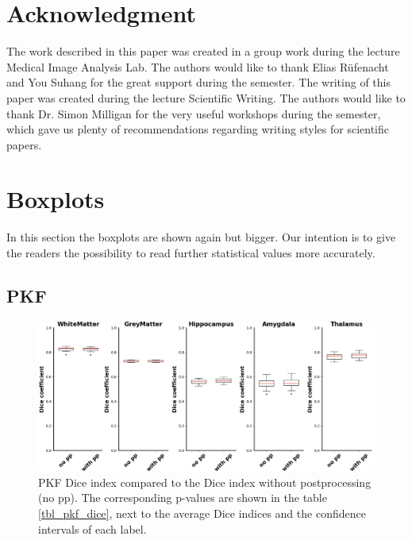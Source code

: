\documentclass[journal]{IEEEtran}
\begin{document}
\section*{Acknowledgment}

The work described in this paper was created in a group work during the lecture Medical Image Analysis Lab. The authors would like to thank Elias R\"ufenacht and You Suhang for the great support during the semester. The writing of this paper was created during the lecture Scientific Writing. The authors would like to thank Dr. Simon Milligan for the very useful workshops during the semester, which gave us plenty of recommendations regarding writing styles for scientific papers.



\newpage
\onecolumn
\section{Boxplots}
\label{sec_bb}
In this section the boxplots are shown again but bigger. Our intention is to give the readers the possibility to read further statistical values more accurately. 
\subsection{PKF}
\label{sec_bb_pfk}
\begin{figure}[h!]
\centering
\includegraphics[width=4.9in]{img/boxplots/PKF-Dice.png}
\caption{PKF Dice index compared to the Dice index without postprocessing (no pp). The corresponding p-values are shown in the table \ref{tbl_pkf_dice}, next to the average Dice indices and the confidence intervals of each label.}
\label{fig_pkf_dice_appendix}
\end{figure}
\end{document}
